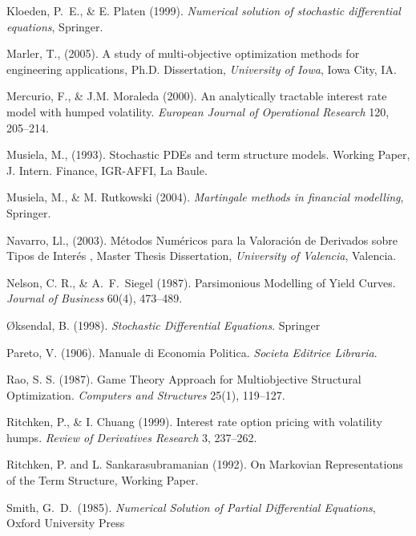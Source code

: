 \begin{thebibliography}{}
{\sc Kloeden, P.~E., \& E. Platen (1999).} \emph{Numerical solution of
  stochastic differential equations}, Springer.

{\sc Marler, T., (2005).} A study of multi-objective optimization
methods for engineering applications, Ph.D. Dissertation,
\emph{University of Iowa}, Iowa City, IA. 

{\sc Mercurio, F., \& J.M. Moraleda (2000).} An analytically tractable interest
rate model with humped volatility. \emph{European Journal of Operational
  Research} 120, 205--214.

{\sc Musiela, M., (1993)}. Stochastic PDEs and term structure models.
Working Paper, J. Intern. Finance,  IGR-AFFI, La Baule.

{\sc Musiela, M., \& M. Rutkowski (2004)}. \emph{Martingale methods in
financial modelling}, Springer. 

{\sc Navarro, Ll., (2003).} M\'etodos Num\'ericos para la Valoraci\'on
de Derivados sobre Tipos de Inter\'es , Master Thesis Dissertation,
\emph{University of Valencia}, Valencia.  

{\sc Nelson, C. R., \& A.~F.~Siegel (1987).} Parsimonious Modelling of Yield
Curves. \emph{Journal of Business} 60(4), 473--489.

{\sc \O ksendal, B. (1998).} \emph{Stochastic Differential Equations}. Springer

{\sc Pareto, V. (1906).} Manuale di Economia Politica. \emph{Societa
  Editrice Libraria}.

{\sc Rao, S. S. (1987).} Game Theory Approach for Multiobjective
Structural Optimization. \emph{Computers and Structures} 25(1), 119--127.

{\sc Ritchken, P., \& I. Chuang (1999).} Interest rate option pricing with
volatility humps. \emph{Review of Derivatives Research} 3, 237--262.

{\sc Ritchken, P. and L. Sankarasubramanian (1992).} On Markovian
Representations of the Term Structure, Working Paper.  

{\sc Smith, G.~D.~(1985).} \emph{Numerical Solution of Partial Differential
Equations}, Oxford University Press

\end{thebibliography}
